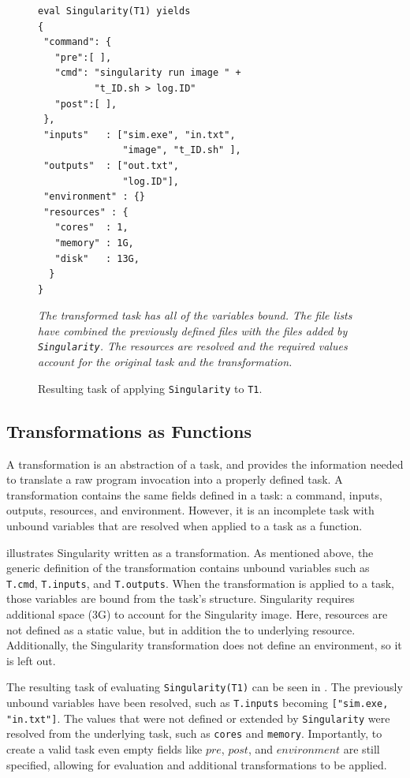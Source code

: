 \documentclass[conference]{IEEEtran}
\begin{document}
\begin{figure}[t]
\begin{framed}
\begin{verbatim}
eval Singularity(T1) yields
{
 "command": {
   "pre":[ ],
   "cmd": "singularity run image " +
          "t_ID.sh > log.ID"
   "post":[ ],
 },
 "inputs"   : ["sim.exe", "in.txt", 
               "image", "t_ID.sh" ],
 "outputs"  : ["out.txt", 
               "log.ID"],
 "environment" : {}
 "resources" : {
   "cores"  : 1, 
   "memory" : 1G, 
   "disk"   : 13G,
  }
}
\end{verbatim}
\end{framed}
\caption{Resulting task of applying {\tt Singularity} to {\tt T1}.}
\small
\emph{The transformed task has all of the variables bound.
The file lists have combined the previously defined files
with the files added by {\tt Singularity}.
The resources are resolved and the required values account
for the original task and the transformation.}
\label{sing-task}
\end{figure}


\subsection{Transformations as Functions}

A transformation is an abstraction of a task,
and provides the information needed
to translate a raw program invocation into 
a properly defined task. 
A transformation contains the same fields defined in a task: 
a command, inputs, outputs, 
resources, and environment.
However, it is an incomplete task with 
unbound variables that are resolved 
when applied to a task as a function.

 illustrates  
Singularity written as a transformation.
As mentioned above, the generic definition of
the transformation contains unbound variables
such as {\tt T.cmd}, {\tt T.inputs}, and
{\tt T.outputs}. 
When the transformation is 
applied to a task, those variables
are bound from the task's structure.
Singularity requires
additional space (3G) to account 
for the Singularity image. 
Here, resources are not defined as
a static value, but in addition the to 
underlying resource. 
Additionally, the Singularity transformation 
does not
define an environment, so it is left out. 


The resulting task of evaluating 
\verb$Singularity(T1)$
can be seen in .
The previously unbound variables have
been resolved, such as {\tt T.inputs}
becoming {\tt ["sim.exe, "in.txt"]}.
The values that were not defined or
extended by \verb$Singularity$ were
resolved from the underlying task,
such as {\tt cores} and {\tt memory}.
Importantly, to create a valid task
even empty fields like $pre$, $post$,
and $environment$ are still specified, 
allowing for evaluation and additional
transformations to be applied.
\end{document}
